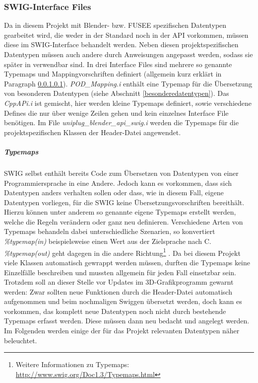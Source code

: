 \subsubsection{SWIG-Interface Files}\label{subsubsec:swiginterface}
Da in diesem Projekt mit Blender- bzw. FUSEE spezifischen Datentypen gearbeitet wird, die weder in der Standard \CC noch in der \CS API vorkommen, müssen diese im SWIG-Interface behandelt werden. Neben diesen projektspezifischen Datentypen müssen auch andere durch Anweisungen angepasst werden, sodass sie später in \CS verwendbar sind. In drei Interface Files sind mehrere so genannte Typemaps und Mappingvorschriften definiert (allgemein kurz erklärt in Paragraph \ref{typemaps}). \emph{POD\_Mapping.i} enthält eine Typemap für die Übersetzung von besonderen Datentypen (siehe Abschnitt \ref{besonderedatentypen}). Das \emph{CppAPi.i} ist gemischt, hier werden kleine Typemaps definiert, sowie verschiedene Defines die nur über wenige Zeilen gehen und kein einzelnes Interface File benötigen. Im File \emph{uniplug\_blender\_api\_swig.i} werden die Typemaps für die projektspezifischen Klassen der Header-Datei angewendet.

\subparagraph{Typemaps}\label{typemaps}
SWIG selbst enthält bereits Code zum Übersetzen von Datentypen von einer Programmiersprache in eine Andere. Jedoch kann es vorkommen, dass sich Datentypen anders verhalten sollen oder dass, wie in diesem Fall, eigene Datentypen vorliegen, für die SWIG keine Übersetzungsvorschriften bereithält. Hierzu können unter anderem so genannte eigene Typemaps erstellt werden, welche die Regeln verändern oder ganz neu definieren. Verschiedene Arten von Typemaps behandeln dabei unterschiedliche Szenarien, so konvertiert \emph{\%typemap(in)} beispielsweise einen Wert aus der Zielsprache nach C. \emph{\%typemap(out)} geht dagegen in die andere Richtung\footnote{Weitere Informationen zu Typemaps: \url{http://www.swig.org/Doc1.3/Typemaps.html}} . Da bei diesem Projekt viele Klassen automatisch gewrappt werden müssen, durften die Typemaps keine Einzelfälle beschreiben und mussten allgemein für jeden Fall einsetzbar sein. Trotzdem soll an dieser Stelle vor Updates im 3D-Grafikprogramm gewarnt werden: Zwar sollten neue Funktionen durch die Header-Datei automatisch aufgenommen und beim nochmaligen Swiggen übersetzt werden, doch kann es vorkommen, das komplett neue Datentypen noch nicht durch bestehende Typemaps erfasst werden. Diese müssen dann neu bedacht und angelegt werden. Im Folgenden werden einige der für das Projekt relevanten Datentypen näher beleuchtet.

